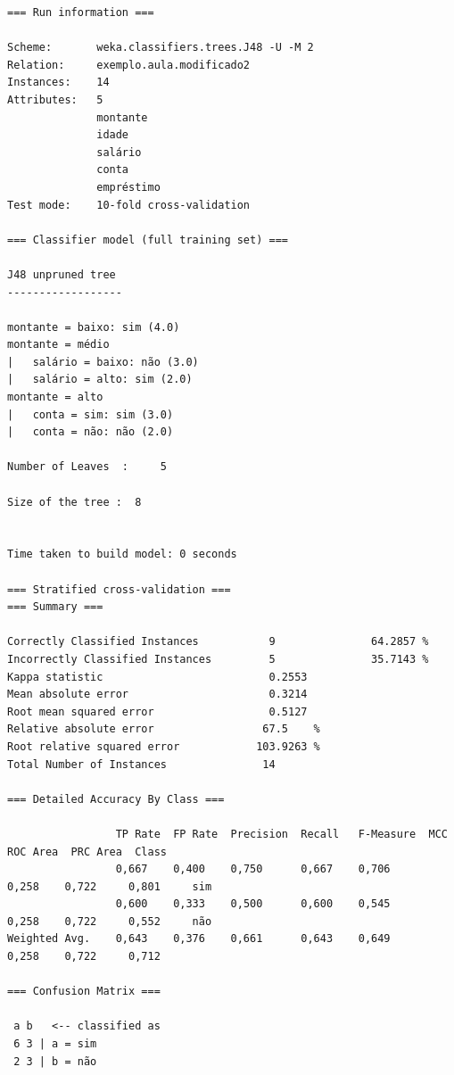 \documentclass[
    article,            %
    11pt,               %
    oneside,            %
    a4paper,            %
    english,            %
    brazil,             %
    sumario=tradicional,
    ]{abntex2}
\begin{document}
\begin{Verbatim}[frame=single, fontsize=\tiny]
=== Run information ===

Scheme:       weka.classifiers.trees.J48 -U -M 2
Relation:     exemplo.aula.modificado2
Instances:    14
Attributes:   5
              montante
              idade
              salário
              conta
              empréstimo
Test mode:    10-fold cross-validation

=== Classifier model (full training set) ===

J48 unpruned tree
------------------

montante = baixo: sim (4.0)
montante = médio
|   salário = baixo: não (3.0)
|   salário = alto: sim (2.0)
montante = alto
|   conta = sim: sim (3.0)
|   conta = não: não (2.0)

Number of Leaves  :     5

Size of the tree :  8


Time taken to build model: 0 seconds

=== Stratified cross-validation ===
=== Summary ===

Correctly Classified Instances           9               64.2857 %
Incorrectly Classified Instances         5               35.7143 %
Kappa statistic                          0.2553
Mean absolute error                      0.3214
Root mean squared error                  0.5127
Relative absolute error                 67.5    %
Root relative squared error            103.9263 %
Total Number of Instances               14     

=== Detailed Accuracy By Class ===

                 TP Rate  FP Rate  Precision  Recall   F-Measure  MCC      ROC Area  PRC Area  Class
                 0,667    0,400    0,750      0,667    0,706      0,258    0,722     0,801     sim
                 0,600    0,333    0,500      0,600    0,545      0,258    0,722     0,552     não
Weighted Avg.    0,643    0,376    0,661      0,643    0,649      0,258    0,722     0,712     

=== Confusion Matrix ===

 a b   <-- classified as
 6 3 | a = sim
 2 3 | b = não
\end{Verbatim}


% 


\postextual

\nocite{material_aula}
\nocite{Witten:2016:DMF:3086818}

\end{document}
